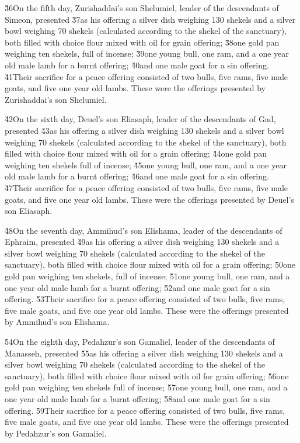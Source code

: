 \v{36}On the fifth day, Zurishaddai's son Shelumiel, leader of the descendants of Simeon, presented \v{37}as his offering a silver dish weighing 130 shekels and a silver bowl weighing 70 shekels (calculated according to the shekel of the sanctuary), both filled with choice flour mixed with oil for grain offering; \v{38}one gold pan weighing ten shekels, full of incense; \v{39}one young bull, one ram, and a one year old male lamb for a burnt offering; \v{40}and one male goat for a sin offering. \v{41}Their sacrifice for a peace offering consisted of two bulls, five rams, five male goats, and five one year old lambs. These were the offerings presented by Zurishaddai's son Shelumiel.

\v{42}On the sixth day, Deuel's son Eliasaph, leader of the descendants of Gad, presented \v{43}as his offering a silver dish weighing 130 shekels and a silver bowl weighing 70 shekels (calculated according to the shekel of the sanctuary), both filled with choice flour mixed with oil for a grain offering; \v{44}one gold pan weighing ten shekels full of incense; \v{45}one young bull, one ram, and a one year old male lamb for a burnt offering; \v{46}and one male goat for a sin offering. \v{47}Their sacrifice for a peace offering consisted of two bulls, five rams, five male goats, and five one year old lambs. These were the offerings presented by Deuel's son Eliasaph.

\v{48}On the seventh day, Ammihud's son Elishama, leader of the descendants of Ephraim, presented \v{49}as his offering a silver dish weighing 130 shekels and a silver bowl weighing 70 shekels (calculated according to the shekel of the sanctuary), both filled with choice flour mixed with oil for a grain offering; \v{50}one gold pan weighing ten shekels, full of incense; \v{51}one young bull, one ram, and a one year old male lamb for a burnt offering; \v{52}and one male goat for a sin offering. \v{53}Their sacrifice for a peace offering consisted of two bulls, five rams, five male goats, and five one year old lambs. These were the offerings presented by Ammihud's son Elishama.

\v{54}On the eighth day, Pedahzur's son Gamaliel, leader of the descendants of Manasseh, presented \v{55}as his offering a silver dish weighing 130 shekels and a silver bowl weighing 70 shekels (calculated according to the shekel of the sanctuary), both filled with choice flour mixed with oil for grain offering; \v{56}one gold pan weighing ten shekels full of incense; \v{57}one young bull, one ram, and a one year old male lamb for a burnt offering; \v{58}and one male goat for a sin offering. \v{59}Their sacrifice for a peace offering consisted of two bulls, five rams, five male goats, and five one year old lambs. These were the offerings presented by Pedahzur's son Gamaliel.

